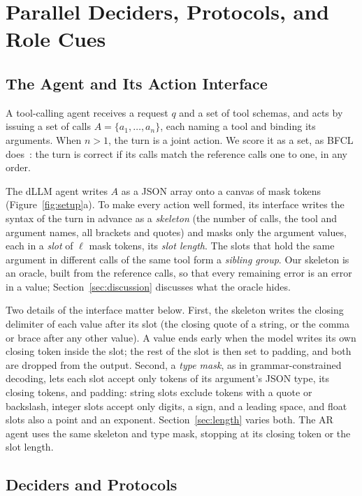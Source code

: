 \section{Parallel Deciders, Protocols, and Role Cues}
\label{sec:setup}

\subsection{The Agent and Its Action Interface}
\label{sec:interface}

A tool-calling agent receives a request $q$ and a set of tool schemas, and acts by issuing a set of calls $A=\{a_1,\dots,a_n\}$, each naming a tool and binding its arguments. When $n>1$, the turn is a joint action. We score it as a set, as BFCL does~\cite{patil2025bfcl}: the turn is correct if its calls match the reference calls one to one, in any order.

The dLLM agent writes $A$ as a JSON array onto a canvas of mask tokens (Figure~\ref{fig:setup}a). To make every action well formed, its interface writes the syntax of the turn in advance as a \emph{skeleton} (the number of calls, the tool and argument names, all brackets and quotes) and masks only the argument values, each in a \emph{slot} of $\ell$ mask tokens, its \emph{slot length}. The slots that hold the same argument in different calls of the same tool form a \emph{sibling group}. Our skeleton is an oracle, built from the reference calls, so that every remaining error is an error in a value; Section~\ref{sec:discussion} discusses what the oracle hides.

Two details of the interface matter below. First, the skeleton writes the closing delimiter of each value after its slot (the closing quote of a string, or the comma or brace after any other value). A value ends early when the model writes its own closing token inside the slot; the rest of the slot is then set to padding, and both are dropped from the output. Second, a \emph{type mask}, as in grammar-constrained decoding, lets each slot accept only tokens of its argument's JSON type, its closing tokens, and padding: string slots exclude tokens with a quote or backslash, integer slots accept only digits, a sign, and a leading space, and float slots also a point and an exponent. Section~\ref{sec:length} varies both. The AR agent uses the same skeleton and type mask, stopping at its closing token or the slot length.

\subsection{Deciders and Protocols}
\label{sec:protocol}

